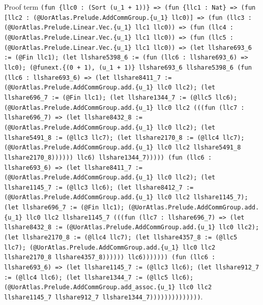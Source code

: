 \documentclass[11pt]{article}
\begin{document}
\noindent Proof term \texttt{(fun \{llc0 : (Sort (u\_1 + 1))\} => (fun \{llc1 : Nat\} => (fun [llc2 : (@UorAtlas.Prelude.AddCommGroup.\{u\_1\} llc0)] => (fun (llc3 : (@UorAtlas.Prelude.Linear.Vec.\{u\_1\} llc1 llc0)) => (fun (llc4 : (@UorAtlas.Prelude.Linear.Vec.\{u\_1\} llc1 llc0)) => (fun (llc5 : (@UorAtlas.Prelude.Linear.Vec.\{u\_1\} llc1 llc0)) => (let llshare693\_6 := (@Fin llc1); (let llshare5398\_6 := (fun (llc6 : llshare693\_6) => llc0); (@funext.\{(0 + 1), (u\_1 + 1)\} llshare693\_6 llshare5398\_6 (fun (llc6 : llshare693\_6) => (let llshare8411\_7 := (@UorAtlas.Prelude.AddCommGroup.add.\{u\_1\} llc0 llc2); (let llshare696\_7 := (@Fin llc1); (let llshare1344\_7 := (@llc5 llc6); (@UorAtlas.Prelude.AddCommGroup.add.\{u\_1\} llc0 llc2 (((fun (llc7 : llshare696\_7) => (let llshare8432\_8 := (@UorAtlas.Prelude.AddCommGroup.add.\{u\_1\} llc0 llc2); (let llshare5491\_8 := (@llc3 llc7); (let llshare2170\_8 := (@llc4 llc7); (@UorAtlas.Prelude.AddCommGroup.add.\{u\_1\} llc0 llc2 llshare5491\_8 llshare2170\_8)))))) llc6) llshare1344\_7))))) (fun (llc6 : llshare693\_6) => (let llshare8411\_7 := (@UorAtlas.Prelude.AddCommGroup.add.\{u\_1\} llc0 llc2); (let llshare1145\_7 := (@llc3 llc6); (let llshare8412\_7 := (@UorAtlas.Prelude.AddCommGroup.add.\{u\_1\} llc0 llc2 llshare1145\_7); (let llshare696\_7 := (@Fin llc1); (@UorAtlas.Prelude.AddCommGroup.add.\{u\_1\} llc0 llc2 llshare1145\_7 (((fun (llc7 : llshare696\_7) => (let llshare8432\_8 := (@UorAtlas.Prelude.AddCommGroup.add.\{u\_1\} llc0 llc2); (let llshare2170\_8 := (@llc4 llc7); (let llshare4357\_8 := (@llc5 llc7); (@UorAtlas.Prelude.AddCommGroup.add.\{u\_1\} llc0 llc2 llshare2170\_8 llshare4357\_8)))))) llc6))))))) (fun (llc6 : llshare693\_6) => (let llshare1145\_7 := (@llc3 llc6); (let llshare912\_7 := (@llc4 llc6); (let llshare1344\_7 := (@llc5 llc6); (@UorAtlas.Prelude.AddCommGroup.add\_assoc.\{u\_1\} llc0 llc2 llshare1145\_7 llshare912\_7 llshare1344\_7))))))))))))))}.\par
\end{document}
